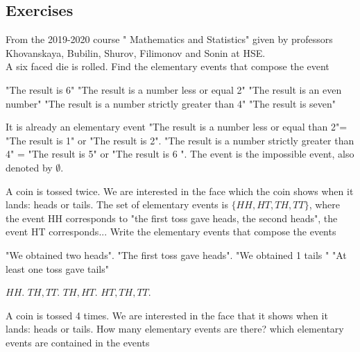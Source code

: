 \documentclass[12pt]{article}
\newcommand{\<}{{\langle \!\! \langle}}
\renewcommand{\>}{{\rangle \!\! \rangle}}
\begin{document}

\subsection{Exercises}

\begin{ExerciseList}
	\Exercise
       From the 2019-2020 course " Mathematics and Statistics" given by  professors 
       Khovanskaya, Bubilin, Shurov, Filimonov and Sonin at HSE.\\ 
       A six faced die is rolled. Find the elementary events that compose the event
    
      \Question "The result is 6"
      \Question "The result is a number less or equal 2"
      \Question "The result is an even number"
      \Question "The result is a number strictly greater than 4"
      \Question "The result is seven"  
    
    	\Answer 
	
	\Question It is already an elementary event 
	\Question "The result is a number less or equal than 2"= "The result is 1" or "The result is 2". 
	\Question "The result is a number strictly greater than 4" = "The result is 5" or "The result is 6 ". 
	\Question The event is the impossible event, also denoted by $\emptyset $. 

	\Exercise  A coin is tossed twice. We are interested in the face which the coin shows when it lands: heads or tails. The set of elementary events is $\{ HH, HT,TH,TT\}$, where the event HH corresponds to "the first toss gave heads, the second heads", the event HT corresponds... Write the elementary events that compose the events
   
         \Question "We obtained two heads".
         \Question "The first toss gave heads".
         \Question "We obtained 1 tails "
         \Question "At least one toss gave tails"
        
    	\Answer 

	\Question $ HH$.
	\Question $ TH, TT$.
	\Question $TH, HT$.
	\Question $HT, TH, TT$.
	
    \Exercise A coin is tossed 4 times. We are interested in the face that it shows when it lands: heads or tails. How many elementary events are there? which elementary events are contained in the events 
    

\end{ExerciseList}
\end{document}
